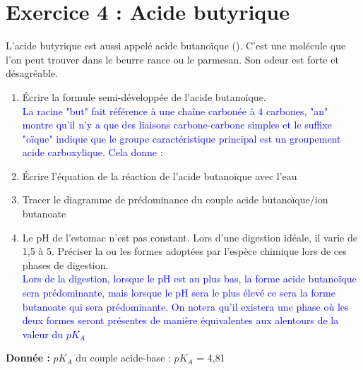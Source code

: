\documentclass[a4paper,12pt]{article}
\begin{document}
\section*{Exercice 4 : Acide butyrique}
L'acide butyrique est aussi appelé acide butanoïque (). C'est une molécule que l'on peut trouver dans le beurre rance ou le parmesan. Son odeur est forte et désagréable.
\begin{enumerate}
	\item Écrire la formule semi-développée de l'acide butanoïque.\\
	\textcolor{blue}{La racine "but" fait référence à une chaîne carbonée à 4 carbones, "an" montre qu'il n'y a que des liaisons carbone-carbone simples et le suffixe "oïque" indique que le groupe caractéristique principal est un groupement acide carboxylique. Cela donne : }
	\item Écrire l'équation de la réaction de l'acide butanoïque avec l'eau\\
	\textcolor{blue}{}
	\item Tracer le diagramme de prédominance du couple acide butanoïque/ion butanoate\\
	\begin{center}
\end{center}
	\item Le pH de l'estomac n'est pas constant. Lors d'une digestion idéale, il varie de 1,5 à 5. Préciser la ou les formes adoptées par l'espèce chimique lors de ces phases de digestion.\\
	\textcolor{blue}{Lors de la digestion, lorsque le pH est au plus bas, la forme acide butanoïque sera prédominante, mais lorsque le pH sera le plus élevé ce sera la forme butanoate qui sera prédominante. On notera qu'il existera une phase où les deux formes seront présentes de manière équivalentes aux alentours de la valeur du $pK_A$}
\end{enumerate}
\textbf{Donnée :} $pK_A$ du couple acide-base : $pK_A$ = 4,81
\end{document}
